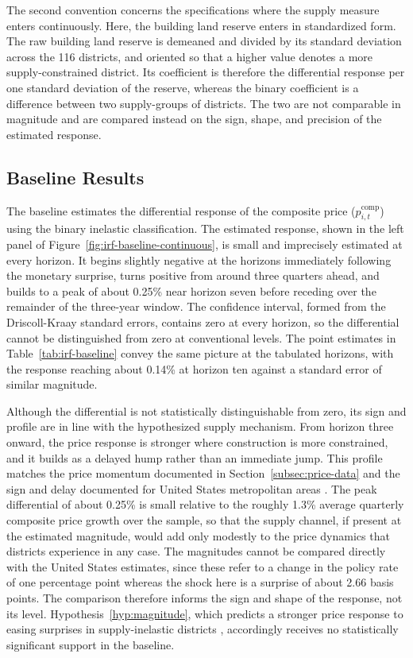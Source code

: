 \documentclass[a4paper,12pt, headsepline]{scrartcl}
\numberwithin{equation}{section}
\begin{document}
The second convention concerns the specifications where the supply measure enters continuously. Here, the building land reserve enters in standardized form. The raw building land reserve is demeaned and divided by its standard deviation across the 116 districts, and oriented so that a higher value denotes a more supply-constrained district. Its coefficient is therefore the differential response per one standard deviation of the reserve, whereas the binary coefficient is a difference between two supply-groups of districts. The two are not comparable in magnitude and are compared instead on the sign, shape, and precision of the estimated response.

\subsection{Baseline Results}\label{subsec:baseline-results}
The baseline estimates the differential response of the composite price ($p^{\text{comp}}_{i,t}$) using the binary inelastic classification. The estimated response, shown in the left panel of Figure~\ref{fig:irf-baseline-continuous}, is small and imprecisely estimated at every horizon. It begins slightly negative at the horizons immediately following the monetary surprise, turns positive from around three quarters ahead, and builds to a peak of about 0.25\% near horizon seven before receding over the remainder of the three-year window. The confidence interval, formed from the Driscoll-Kraay standard errors, contains zero at every horizon, so the differential cannot be distinguished from zero at conventional levels. The point estimates in Table~\ref{tab:irf-baseline} convey the same picture at the tabulated horizons, with the response reaching about 0.14\% at horizon ten against a standard error of similar magnitude.

Although the differential is not statistically distinguishable from zero, its sign and profile are in line with the hypothesized supply mechanism. From horizon three onward, the price response is stronger where construction is more constrained, and it builds as a delayed hump rather than an immediate jump. This profile matches the price momentum documented in Section~\ref{subsec:price-data} \citep{case1988, guren2018} and the sign and delay documented for United States metropolitan areas \citep{aastveit2022}. The peak differential of about 0.25\% is small relative to the roughly 1.3\% average quarterly composite price growth over the sample, so that the supply channel, if present at the estimated magnitude, would add only modestly to the price dynamics that districts experience in any case. The magnitudes cannot be compared directly with the United States estimates, since these refer to a change in the policy rate of one percentage point whereas the shock here is a surprise of about 2.66 basis points. The comparison therefore informs the sign and shape of the response, not its level. Hypothesis~\ref{hyp:magnitude}, which predicts a stronger price response to easing surprises in supply-inelastic districts \citep{saiz2010, aastveit2022}, accordingly receives no statistically significant support in the baseline.
\end{document}
